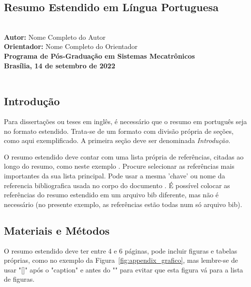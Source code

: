 \begin{refsection}

\chapter{Resumo Estendido em Língua Portuguesa}\label{appendix:pt_estendido}
\setlength{\absparsep}{18pt} %
{\normalsize{}\\}
{\normalsize{\textbf{Autor:} Nome Completo do Autor}\\}
{\normalsize{\textbf{Orientador:} Nome Completo do Orientador}\\}
{\normalsize{\textbf{Programa de Pós-Graduação em Sistemas Mecatrônicos}}\\}
{\normalsize{\textbf{Brasília, 14 de setembro de 2022}}\\\\}
{\normalsize{}}

\vspace{-5mm}

\vspace{14pt}

\section*{Introdução}
Para dissertações ou teses em inglês, é necessário que o resumo em português seja no formato estendido. Trata-se de um formato com divisão própria de seções, como aqui exemplificado. A primeira seção deve ser denominada \emph{Introdução}.

O resumo estendido deve contar com uma lista própria de referências, citadas ao longo do resumo, como neste exemplo \cite{talbot2012}. Procure selecionar as referências mais importantes da sua lista principal. Pode usar a mesma 'chave' ou nome da referencia bibliografica usada no corpo do documento \cite{ibge1993}. É possível colocar as referências do resumo estendido em um arquivo bib diferente, mas não é necessário (no presente exemplo, as referências estão todas num só arquivo bib).

\section*{Materiais e Métodos}
O resumo estendido deve ter entre 4 e 6 páginas, pode incluir figuras e tabelas próprias, como no exemplo da Figura~\ref{fig:appendix_grafico}, mas lembre-se de usar "[]" após o "caption" e antes do "{}" para evitar que esta figura vá para a lista de figuras.


\end{refsection}
